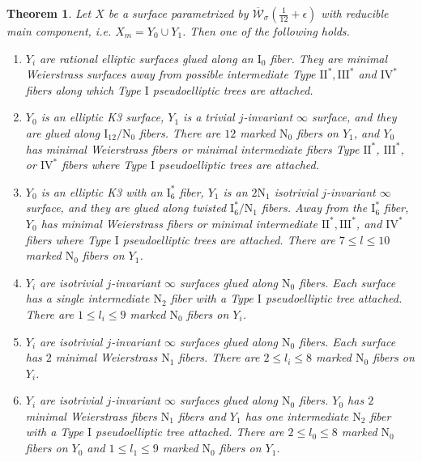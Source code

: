 \documentclass[11pt]{amsart}
\newtheorem{theorem}{Theorem}[section]
\theoremstyle{definition}
\theoremstyle{remark}
\newcommand{\calW}{\mathcal W}
\newcommand{\ktwelve}{\overline{\calW}_\sigma({\frac{1}{12}+\epsilon})}
\begin{document}
	\begin{theorem}\label{thm:twomaincomp} Let $X$ be a surface parametrized by $\ktwelve$ with reducible main component, i.e. $X_m = Y_0 \cup Y_1$. Then one of the following holds.
		\begin{enumerate}
			\item $Y_i$ are rational elliptic surfaces glued along an $\mathrm{I}_0$ fiber. They are minimal Weierstrass surfaces away from possible intermediate Type $\mathrm{II}^*, \mathrm{III}^*$ and $\mathrm{IV}^*$ fibers along which Type $\mathrm{I}$ pseudoelliptic trees are attached.
			
			\item $Y_0$ is an elliptic K3 surface, $Y_1$ is a trivial $j$-invariant $\infty$ surface, and they are glued along $\mathrm{I}_{12}/\mathrm{N}_0$ fibers. There are $12$ marked $\mathrm{N}_0$ fibers on $Y_1$, and $Y_0$ has minimal Weierstrass fibers or minimal intermediate fibers Type $\mathrm{II}^*$, $\mathrm{III}^*$, or $\mathrm{IV}^*$ fibers where Type $\mathrm{I}$ pseudoelliptic trees are attached. 
			
			\item $Y_0$ is an elliptic K3 with an $\mathrm{I}_6^*$ fiber, $Y_1$ is an $2\mathrm{N}_1$ isotrivial $j$-invariant $\infty$ surface, and they are glued along twisted $\mathrm{I}_6^*/\mathrm{N}_1$ fibers. Away from the $\mathrm{I}_6^*$ fiber, $Y_0$ has minimal Weierstrass fibers or minimal intermediate $\mathrm{II}^*, \mathrm{III}^*$, and $\mathrm{IV}^*$ fibers where Type $\mathrm{I}$ pseudoelliptic trees are attached. There are $7 \le l \le 10$ marked $\mathrm{N}_0$ fibers on $Y_1$. 
			
			\item $Y_i$ are isotrivial $j$-invariant $\infty$ surfaces glued along $\mathrm{N}_0$ fibers. Each surface has a single intermediate $\mathrm{N}_2$ fiber with a Type $\mathrm{I}$ pseudoelliptic tree attached. There are $1 \le l_i \le 9$ marked $\mathrm{N}_0$ fibers on $Y_i$. 
			
			\item $Y_i$ are isotrivial $j$-invariant $\infty$ surfaces glued along $\mathrm{N}_0$ fibers. Each surface has $2$ minimal Weierstrass $\mathrm{N}_1$ fibers. There are $2 \le l_i \le 8$ marked $\mathrm{N}_0$ fibers on $Y_i$. 
			
			\item $Y_i$ are isotrivial $j$-invariant $\infty$ surfaces glued along $\mathrm{N}_0$ fibers. $Y_0$ has $2$ minimal Weierstrass fibers $\mathrm{N}_1$ fibers and $Y_1$ has one intermediate $\mathrm{N}_2$ fiber with a Type $\mathrm{I}$ pseudoelliptic tree attached. There are $2 \le l_0 \le 8$ marked $\mathrm{N}_0$ fibers on $Y_0$ and $1 \le l_1 \le 9$ marked $\mathrm{N}_0$ fibers on $Y_1$. 
			
		\end{enumerate}
		
	\end{theorem} 
	
\end{document}
